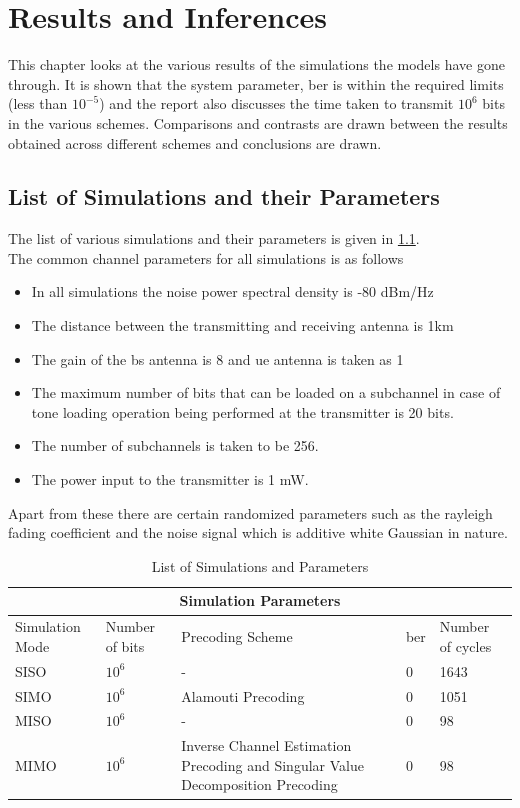 \chapter{Results and Inferences}

This chapter looks at the various results of the simulations the models have gone through. It is shown that the system parameter, \acrshort{ber} is within the required limits (less than $10^{-5}$) and the report also discusses the time taken to transmit $10^6$ bits in the various schemes. Comparisons and contrasts are drawn between the results obtained across different schemes and conclusions are drawn.

\section{List of Simulations and their Parameters}
The list of various simulations and their parameters is given in \ref{List of Simulations and their Parameters}.\\

The common channel parameters for all simulations is as follows
\begin{itemize}
\item In all simulations the noise power spectral density is -80 dBm/Hz
\item The distance between the transmitting and receiving antenna is 1km
\item The gain of the \acrshort{bs} antenna is 8 and \acrshort{ue} antenna is taken as 1
\item The maximum number of bits that can be loaded on a subchannel in case of tone loading operation being performed at the transmitter is 20 bits.
\item The number of subchannels is taken to be 256.
\item The power input to the transmitter is 1 mW.
\end{itemize}

Apart from these there are certain randomized parameters such as the \gls{rayleigh fading} coefficient and the noise signal which is additive white Gaussian in nature.

\begin{table}[htpb]
\centering
\label{List of Simulations and their Parameters}
\caption{List of Simulations and Parameters}
\begin{tabular}{ |p{3cm}||p{3cm}|p{3cm}|p{3cm}| |p{3cm}|}
 \hline
 \multicolumn{5}{|c|}{Simulation Parameters} \\
 \hline
 Simulation Mode & Number of bits & Precoding Scheme & \acrshort{ber} & Number of cycles\\
 \hline
 SISO & $10^6$    & - &   0 & 1643\\
 SIMO & $10^6$    & Alamouti Precoding &   0 & 1051\\
 MISO & $10^6$    & - &   0 & 98\\
 MIMO & $10^6$    & Inverse Channel Estimation Precoding and Singular Value Decomposition Precoding &   0 & 98\\
 \hline
\end{tabular}
\end{table}

